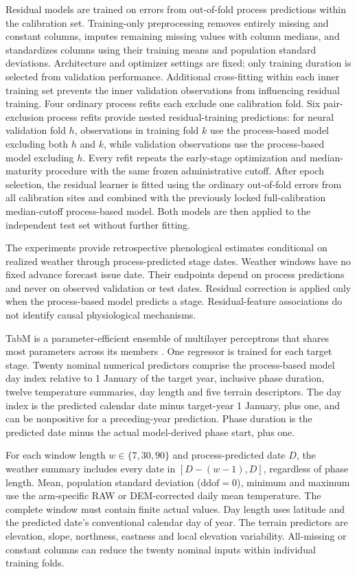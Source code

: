 \documentclass[a4paper,11pt]{article}
\begin{document}
Residual models are trained on errors from out-of-fold process predictions within the calibration set. Training-only preprocessing removes entirely missing and constant columns, imputes remaining missing values with column medians, and standardizes columns using their training means and population standard deviations. Architecture and optimizer settings are fixed; only training duration is selected from validation performance. Additional cross-fitting within each inner training set prevents the inner validation observations from influencing residual training. Four ordinary process refits each exclude one calibration fold. Six pair-exclusion process refits provide nested residual-training predictions: for neural validation fold $h$, observations in training fold $k$ use the process-based model excluding both $h$ and $k$, while validation observations use the process-based model excluding $h$. Every refit repeats the early-stage optimization and median-maturity procedure with the same frozen administrative cutoff. After epoch selection, the residual learner is fitted using the ordinary out-of-fold errors from all calibration sites and combined with the previously locked full-calibration median-cutoff process-based model. Both models are then applied to the independent test set without further fitting.

The experiments provide retrospective phenological estimates conditional on realized weather through process-predicted stage dates. Weather windows have no fixed advance forecast issue date. Their endpoints depend on process predictions and never on observed validation or test dates. Residual correction is applied only when the process-based model predicts a stage. Residual-feature associations do not identify causal physiological mechanisms.

TabM is a parameter-efficient ensemble of multilayer perceptrons that shares
most parameters across its members \citep{gorishniyTabMAdvancingTabular2025}.
One regressor is trained for each target stage. Twenty nominal numerical
predictors comprise the process-based model day index relative to 1 January of the
target year, inclusive phase duration, twelve temperature summaries, day length
and five terrain descriptors. The day index is the predicted calendar date
minus target-year 1 January, plus one, and can be nonpositive for a preceding-year
prediction. Phase duration is the predicted date minus the actual model-derived
phase start, plus one.

For each window length $w\in\{7,30,90\}$ and process-predicted date $D$, the
weather summary includes every date in $[D-(w-1),D]$, regardless of phase
length. Mean, population standard deviation ($\mathrm{ddof}=0$), minimum and
maximum use the arm-specific RAW or DEM-corrected daily mean temperature.
The complete window must contain finite actual values. Day length uses latitude
and the predicted date's conventional calendar day of year. The terrain
predictors are elevation, slope, northness, eastness and local elevation
variability. All-missing or constant columns can reduce the twenty nominal
inputs within individual training folds.
\end{document}
